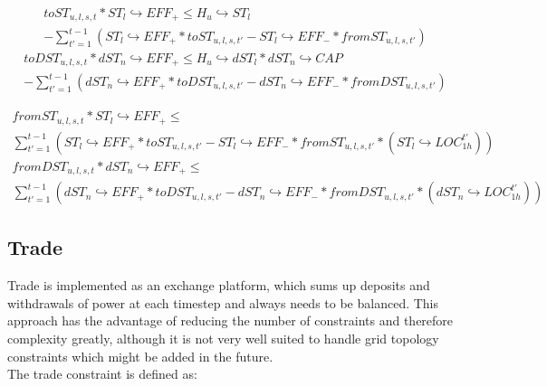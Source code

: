 \documentclass[
	11pt,								%
	DIV10,								%
	a4paper,         					%
	oneside,							%
	headheight=20pt,					%
	footheight=20pt,					%
    parskip=full,						%
    listof=totoc,						%
	bibliography=totoc,					%
	index=totoc,						%
]{scrartcl}
\begin{document}
	
	\begin{equation}
		\begin{split}
		toST_{u,l,s,t} * ST_l \hookrightarrow EFF_{+} \leq H_u\hookrightarrow  ST_l\\ -
		\sum_{t'=1}^{t-1}(ST_l \hookrightarrow EFF_{+} * toST_{u,l,s,t'} - ST_l \hookrightarrow EFF_{-} * fromST_{u,l,s,t'})
		\end{split}
	\end{equation}
	\begin{equation}
		\begin{split}
		toDST_{u,l,s,t} * dST_n \hookrightarrow EFF_{+} \leq H_u\hookrightarrow  dST_l * dST_n\hookrightarrow  CAP\\
		- \sum_{t'=1}^{t-1}(dST_n \hookrightarrow EFF_{+} * toDST_{u,l,s,t'} - dST_n \hookrightarrow EFF_{-} * fromDST_{u,l,s,t'})
		\end{split}
	\end{equation}
	
	\begin{equation}
	\begin{split}
		fromST_{u,l,s,t} * ST_l \hookrightarrow EFF_{+} \leq \\
		\sum_{t'=1}^{t-1}(ST_l \hookrightarrow EFF_{+} * toST_{u,l,s,t'} - ST_l \hookrightarrow EFF_{-} * fromST_{u,l,s,t'}*(ST_l \hookrightarrow LOC_{1h}^{t'}))
		\end{split}
	\end{equation}
	\begin{equation}
	\begin{split}
		fromDST_{u,l,s,t} * dST_n \hookrightarrow EFF_{+} \leq \\
		\sum_{t'=1}^{t-1}(dST_n \hookrightarrow EFF_{+} * toDST_{u,l,s,t'} - dST_n \hookrightarrow EFF_{-} * fromDST_{u,l,s,t'}*(dST_n \hookrightarrow LOC_{1h}^{t'}))
	\end{split}
	\end{equation}




\subsection{Trade}
Trade is implemented as an exchange platform, which sums up deposits and withdrawals of power at each timestep and always needs to be balanced. This approach has the advantage of reducing the number of constraints and therefore complexity greatly, although it is not very well suited to handle grid topology constraints which might be added in the future.\\
The trade constraint is defined as:
\\
\end{document}
